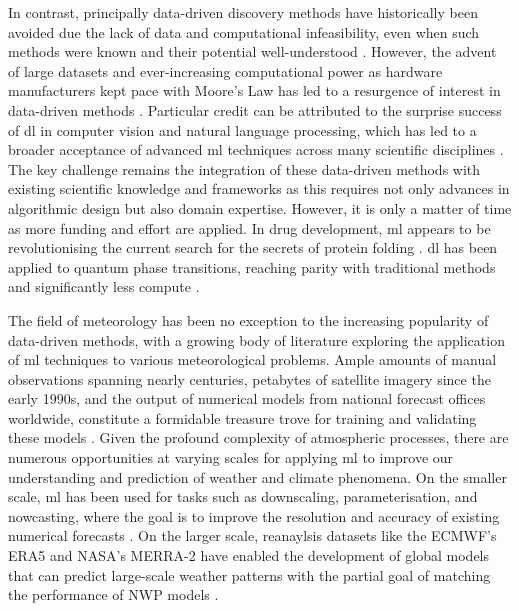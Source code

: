 In contrast, principally data-driven discovery methods have historically been avoided due the lack of data and computational infeasibility, even when such methods were known and their potential well-understood . However, the advent of large datasets and ever-increasing computational power as hardware manufacturers kept pace with Moore's Law  has led to a resurgence of interest in data-driven methods . Particular credit can be attributed to the surprise success of \acrfull{dl} in computer vision and natural language processing, which has led to a broader acceptance of advanced \acrfull{ml} techniques across many scientific disciplines . The key challenge remains the integration of these data-driven methods with existing scientific knowledge and frameworks as this requires not only advances in algorithmic design but also domain expertise. However, it is only a matter of time as more funding and effort are applied. In drug development, \acrfull{ml} appears to be revolutionising the current search for the secrets of protein folding . \acrshort{dl} has been applied to quantum phase transitions, reaching parity with traditional methods and significantly less compute .

The field of meteorology has been no exception to the increasing popularity of data-driven methods, with a growing body of literature exploring the application of \acrshort{ml} techniques to various meteorological problems. Ample amounts of manual observations spanning nearly centuries, petabytes of satellite imagery since the early 1990s, and the output of numerical models from national forecast offices worldwide, constitute a formidable treasure trove for training and validating these models \citep{Waqas2024}. Given the profound complexity of atmospheric processes, there are numerous opportunities at varying scales for applying \acrshort{ml} to improve our understanding and prediction of weather and climate phenomena. On the smaller scale, \acrshort{ml} has been used for tasks such as downscaling, parameterisation, and nowcasting, where the goal is to improve the resolution and accuracy of existing numerical forecasts \citep{Blunn2024,Zhang2023}. On the larger scale, reanaylsis datasets like the ECMWF's ERA5 and NASA's MERRA-2 have enabled the development of global models that can predict large-scale weather patterns with the partial goal of matching the performance of NWP models .

